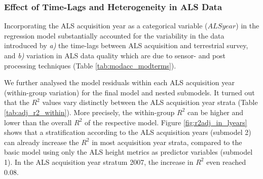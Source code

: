 \subsubsection*{Effect of Time-Lags and Heterogeneity in ALS Data}

Incorporating the ALS acquisition year as a categorical variable ($ALSyear$) in the regression model substantially accounted for the variability in the data introduced by \textit{a)} the time-lags between ALS acquisition and terrestrial survey, and \textit{b)} variation in ALS data quality which are due to sensor- and post processing techniques (Table \ref{tab:modacc_modterms}). \par

We further analysed the model residuals within each ALS acquisition year (within-group variation) for the final model and nested submodels. It turned out that the $R^2$ values vary distinctly between the ALS acquisition year strata (Table \ref{tab:adj_r2_within}). More precisely, the within-group $R^2$ can be higher and lower than the overall $R^2$ of the respective model. Figure \ref{fig:r2adj_in_lyears} shows that a stratification according to the ALS acquisition years (submodel 2) can already increase the $R^2$ in most acquisition year strata, compared to the basic model using only the ALS height metrics as predictor variables (submodel 1). In the ALS acquisition year stratum 2007, the increase in $R^2$ even reached 0.08.



